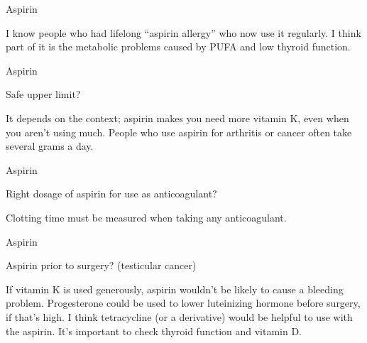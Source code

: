\documentclass[11pt,oneside,openany,extrafontsizes]{memoir}
\begin{document}
\begin{standalonequote}{Aspirin}

    \begin{answer}
        I know people who had lifelong \enquote{aspirin allergy} who now use it regularly. I think part of it is the metabolic problems caused by PUFA and low thyroid function.
    \end{answer}
\end{standalonequote}

\begin{qaexchange}{Aspirin}

    \begin{question}
        Safe upper limit?
    \end{question}

    \begin{answer}
        It depends on the context; aspirin makes you need more vitamin K, even when you aren't using much. People who use aspirin for arthritis or cancer often take several grams a day.
    \end{answer}
\end{qaexchange}

\begin{qaexchange}{Aspirin}

    \begin{question}
        Right dosage of aspirin for use as anticoagulant?
    \end{question}

    \begin{answer}
        Clotting time must be measured when taking any anticoagulant.
    \end{answer}
\end{qaexchange}

\begin{qaexchange}{Aspirin}

    \begin{question}
        Aspirin prior to surgery? (testicular cancer)
    \end{question}

    \begin{answer}
        If vitamin K is used generously, aspirin wouldn't be likely to cause a bleeding problem. Progesterone could be used to lower luteinizing hormone before surgery, if that's high. I think tetracycline (or a derivative) would be helpful to use with the aspirin. It's important to check thyroid function and vitamin D.
    \end{answer}
\end{qaexchange}
\end{document}
